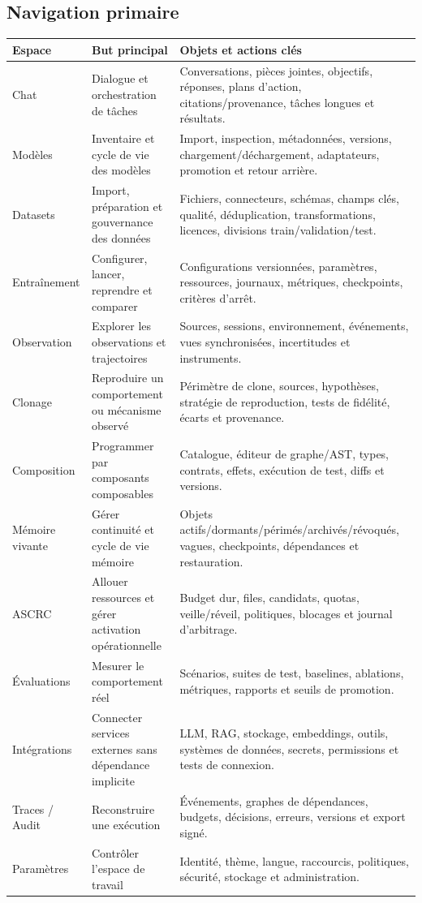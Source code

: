 \documentclass[11pt,a4paper]{article}
\begin{document}
\subsection{Navigation primaire}
\begin{longtable}{p{}p{}p{}}
\toprule
\textbf{Espace} & \textbf{But principal} & \textbf{Objets et actions clés}\\
\midrule
Chat & Dialogue et orchestration de tâches & Conversations, pièces jointes, objectifs, réponses, plans d'action, citations/provenance, tâches longues et résultats.\\
Modèles & Inventaire et cycle de vie des modèles & Import, inspection, métadonnées, versions, chargement/déchargement, adaptateurs, promotion et retour arrière.\\
Datasets & Import, préparation et gouvernance des données & Fichiers, connecteurs, schémas, champs clés, qualité, déduplication, transformations, licences, divisions train/validation/test.\\
Entraînement & Configurer, lancer, reprendre et comparer & Configurations versionnées, paramètres, ressources, journaux, métriques, checkpoints, critères d'arrêt.\\
Observation & Explorer les observations et trajectoires & Sources, sessions, environnement, événements, vues synchronisées, incertitudes et instruments.\\
Clonage & Reproduire un comportement ou mécanisme observé & Périmètre de clone, sources, hypothèses, stratégie de reproduction, tests de fidélité, écarts et provenance.\\
Composition & Programmer par composants composables & Catalogue, éditeur de graphe/AST, types, contrats, effets, exécution de test, diffs et versions.\\
Mémoire vivante & Gérer continuité et cycle de vie mémoire & Objets actifs/dormants/périmés/archivés/révoqués, vagues, checkpoints, dépendances et restauration.\\
ASCRC & Allouer ressources et gérer activation opérationnelle & Budget dur, files, candidats, quotas, veille/réveil, politiques, blocages et journal d'arbitrage.\\
Évaluations & Mesurer le comportement réel & Scénarios, suites de test, baselines, ablations, métriques, rapports et seuils de promotion.\\
Intégrations & Connecter services externes sans dépendance implicite & LLM, RAG, stockage, embeddings, outils, systèmes de données, secrets, permissions et tests de connexion.\\
Traces / Audit & Reconstruire une exécution & Événements, graphes de dépendances, budgets, décisions, erreurs, versions et export signé.\\
Paramètres & Contrôler l'espace de travail & Identité, thème, langue, raccourcis, politiques, sécurité, stockage et administration.\\
\bottomrule
\end{longtable}
\end{document}

